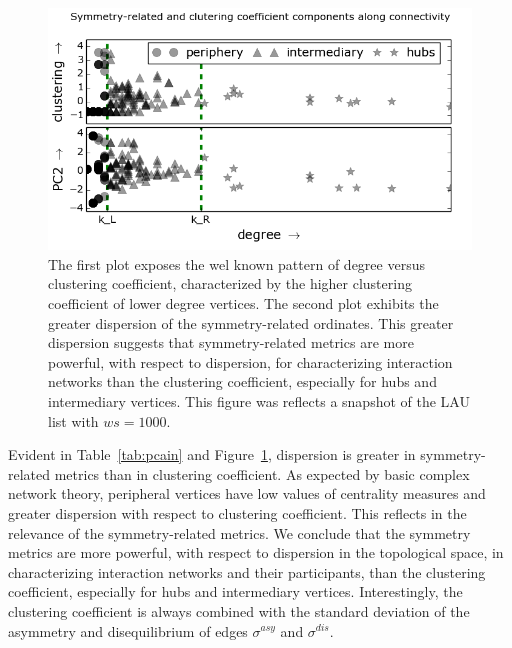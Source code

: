 \documentclass[%
	aip,
	jmp,%
	amsmath,amssymb,
	reprint,%
]{revtex4-1}
\begin{document}
\begin{figure} 
	\centering
	\includegraphics[width=.45\textwidth]{figs/im13PCAPLOT__}
	\caption{The first plot exposes the wel known pattern of degree versus clustering coefficient, characterized by the higher clustering coefficient of lower degree vertices.
		The second plot exhibits the greater dispersion of the symmetry-related ordinates.
		This greater dispersion suggests that symmetry-related metrics are more powerful, with respect to dispersion,
		for characterizing interaction networks than the clustering coefficient,
		especially for hubs and intermediary vertices.
	This figure was reflects a snapshot of the LAU list with $ws= 1000$.}

	\label{fig:sym}
\end{figure}

Evident in Table~\ref{tab:pcain} and Figure~\ref{fig:sym},
dispersion is greater in symmetry-related
metrics than in clustering coefficient.
As expected by basic complex network theory, 
peripheral vertices have low values
of centrality measures
and greater dispersion with respect to clustering coefficient.
This reflects in the relevance of the symmetry-related metrics.
We conclude that the symmetry metrics are more powerful,
with respect to dispersion in the topological space,
in characterizing interaction networks
and their participants, than the clustering coefficient,
especially for hubs and intermediary vertices.
Interestingly, the clustering coefficient is always combined
with the standard deviation of the asymmetry and disequilibrium
of edges $\sigma^{asy}$ and $\sigma^{dis}$.
\end{document}
